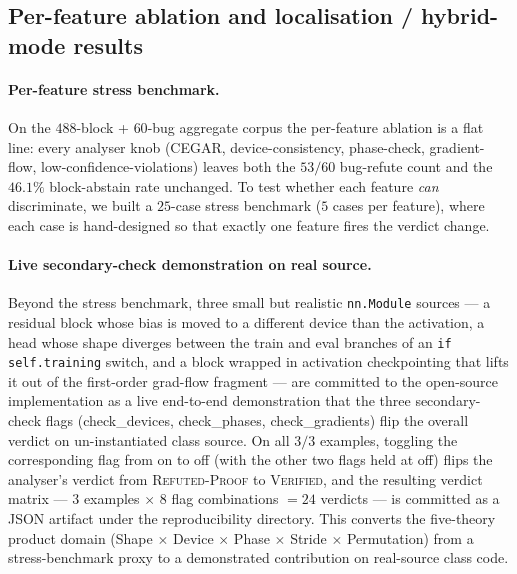 \subsection{Per-feature ablation and localisation /
 hybrid-mode results}
\label{sec:eval-loc-hybrid}

\paragraph{Per-feature stress benchmark.}
On the $488$-block + $60$-bug aggregate corpus the per-feature
ablation is a flat line: every analyser knob (CEGAR,
device-consistency, phase-check, gradient-flow,
low-confidence-violations) leaves both the $53/60$ bug-refute
count and the $46.1\%$ block-abstain rate unchanged. To test
whether each feature \emph{can} discriminate, we built a
$25$-case stress benchmark ($5$ cases per feature),
where each case is hand-designed so that exactly one feature
fires the verdict change.

\paragraph{Live secondary-check demonstration on real source.}
\label{sec:eval-check-flag-demo}
Beyond the stress benchmark, three small but realistic
\texttt{nn.Module} sources --- a residual block whose bias is
moved to a different device than the activation, a head whose
shape diverges between the train and eval branches of an
\texttt{if self.training} switch, and a block wrapped in
activation checkpointing that lifts it out of the first-order
grad-flow fragment --- are committed to the open-source
implementation as a live end-to-end demonstration that the three
secondary-check flags
(\textsf{check\_devices}, \textsf{check\_phases},
\textsf{check\_gradients}) flip the overall verdict on
un-instantiated class source. On all $3/3$ examples, toggling
the corresponding flag from on to off (with the other two flags
held at off) flips the analyser's verdict from
\textsc{Refuted-Proof} to \textsc{Verified}, and the resulting
verdict matrix --- $3$ examples $\times$ $8$ flag combinations
$=24$ verdicts --- is committed as a JSON artifact under the
reproducibility directory.  This converts the five-theory product
domain (Shape $\times$ Device $\times$ Phase $\times$ Stride
$\times$ Permutation) from a stress-benchmark proxy to a
demonstrated contribution on real-source class code.

